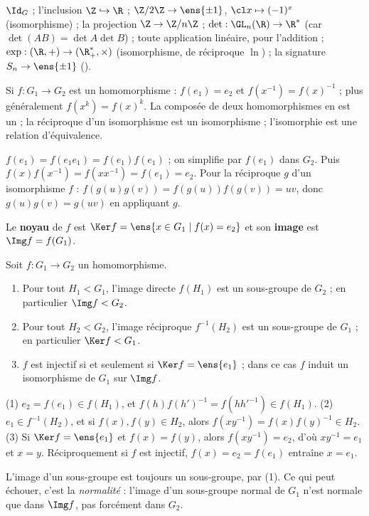 \begin{exemple}
$\Id_G$ ; l'inclusion $\Z\hookrightarrow\R$ ; $\Z/2\Z\to\ens{\pm1}$, $\cl x\mapsto(-1)^x$ (isomorphisme) ; la projection $\Z\to\Z/n\Z$ ; $\det:\GL_n(\R)\to\R^*$ (car $\det(AB)=\det A\det B$) ; toute application linéaire, pour l'addition ; $\exp:(\R,+)\to(\R_+^*,\times)$ (isomorphisme, de réciproque $\ln$) ; la signature $S_n\to\ens{\pm1}$ ().
\end{exemple}
\begin{proposition}\label{prop-hom-base}
Si $f:G_1\to G_2$ est un homomorphisme : $f(e_1)=e_2$ et $f(x^{-1})=f(x)^{-1}$ ; plus généralement $f(x^k)=f(x)^k$. La composée de deux homomorphismes en est un ; la réciproque d'un isomorphisme est un isomorphisme ; l'isomorphie est une relation d'équivalence.
\end{proposition}
\begin{preuve}
$f(e_1)=f(e_1e_1)=f(e_1)f(e_1)$ ; on simplifie par $f(e_1)$ dans $G_2$. Puis $f(x)f(x^{-1})=f(xx^{-1})=f(e_1)=e_2$. Pour la réciproque $g$ d'un isomorphisme $f$ : $f(g(u)g(v))=f(g(u))f(g(v))=uv$, donc $g(u)g(v)=g(uv)$ en appliquant $g$.
\end{preuve}
\begin{definition}
Le \textbf{noyau} de $f$ est $\Ker f=\ens{x\in G_1\mid f(x)=e_2}$ et son \textbf{image} est $\Img f=f(G_1)$.
\end{definition}
\begin{proposition}\label{prop-hom}
Soit $f:G_1\to G_2$ un homomorphisme.
\begin{enumerate}
\item Pour tout $H_1<G_1$, l'image directe $f(H_1)$ est un sous-groupe de $G_2$ ; en particulier $\Img f<G_2$.
\item Pour tout $H_2<G_2$, l'image réciproque $f^{-1}(H_2)$ est un sous-groupe de $G_1$ ; en particulier $\Ker f<G_1$.
\item $f$ est injectif si et seulement si $\Ker f=\ens{e_1}$ ; dans ce cas $f$ induit un isomorphisme de $G_1$ sur $\Img f$.
\end{enumerate}
\end{proposition}
\begin{preuve}
(1) $e_2=f(e_1)\in f(H_1)$, et $f(h)f(h')^{-1}=f(hh'^{-1})\in f(H_1)$. (2) $e_1\in f^{-1}(H_2)$, et si $f(x),f(y)\in H_2$, alors $f(xy^{-1})=f(x)f(y)^{-1}\in H_2$. (3) Si $\Ker f=\ens{e_1}$ et $f(x)=f(y)$, alors $f(xy^{-1})=e_2$, d'où $xy^{-1}=e_1$ et $x=y$. Réciproquement si $f$ est injectif, $f(x)=e_2=f(e_1)$ entraîne $x=e_1$.
\end{preuve}
\begin{attention}
L'image d'un sous-groupe est toujours un sous-groupe, par (1). Ce qui peut échouer, c'est la \emph{normalité} : l'image d'un sous-groupe normal de $G_1$ n'est normale que dans $\Img f$, pas forcément dans $G_2$.
\end{attention}

